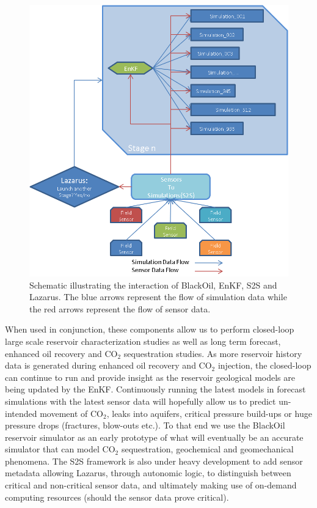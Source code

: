 \documentclass[conference,final]{IEEEtran}
\begin{document}
\begin{figure}
\begin{center}
\includegraphics*[scale=0.7,angle=0]{figures/Picture2.png}
\end{center}
\caption{Schematic illustrating the interaction of BlackOil, EnKF, S2S and Lazarus. The 
blue arrows represent the flow of 
simulation data while the red arrows represent the flow of sensor data.}
\label{fig:irregular_execution}
\end{figure}


When used in conjunction, these components allow us to perform closed-loop large scale 
reservoir characterization studies as well as long term forecast, enhanced oil recovery 
and CO$_2$ sequestration studies. As more reservoir history data is generated during 
enhanced oil recovery and CO$_2$ injection, the closed-loop can continue to run and 
provide insight as the reservoir geological models are being updated by the EnKF. 
Continuously running the latest models in forecast simulations with the 
latest sensor data will hopefully allow us to predict un-intended movement of CO$_2$, 
leaks into aquifers, critical pressure build-ups or huge pressure drops (fractures, 
blow-outs etc.). To that end we use the BlackOil reservoir simulator as an early prototype 
of what will eventually be an accurate simulator that can model CO$_2$ sequestration, 
geochemical and geomechanical phenomena. The S2S framework is also under heavy development 
to add sensor metadata allowing Lazarus, through autonomic logic, to distinguish between 
critical and non-critical sensor data, and ultimately making use of on-demand computing 
resources (should the sensor data prove critical).
\end{document}
